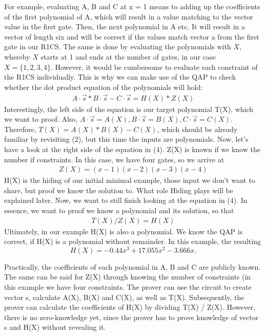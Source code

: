 For example, evaluating A, B and C at x = 1 means to adding up the coefficients of the first polynomial of A, which will result in a value matching to the vector value in the first gate. Then, the next polynomial in A etc. It will result in a vector of length six and will be correct if the values match vector a from the first gate in our R1CS. The same is done by evaluating the polynomials with \(X\), whereby \(X\) starts at 1 and ends at the number of gates, in our case \(X=\{1,2,3,4\}\).
However, it would be cumbersome to evaluate each constraint of the R1CS individually. This is why we can make use of the QAP to check whether the dot product equation of the polynomials will hold:
\begin{align}
    A\cdot \Vec{s} * B\cdot \Vec{s} - C\cdot \Vec{s} = H(X) * Z(X)
\end{align}
Interestingly, the left side of the equation is our target polynomial T(X), which we want to proof. Also, \(A \cdot \Vec{s} = A(X), B \cdot \Vec{s} = B(X),  C \cdot \Vec{s} = C(X).\) 
Therefore, \(T(X) = A(X) * B(X) - C(X)\), which should be already familiar by revisiting (2), but this time the inputs are polynomials.
Now, let's have a look at the right side of the equation in (4). Z(X) is known if we know the number if constraints. In this case, we have four gates, so we arrive at
\begin{align}
    Z(X) = (x-1)(x-2)(x-3)(x-4)
\end{align}
H(X) is the hiding of our initial minimal example, those input we don't want to share, but proof we know the solution to. What role Hiding plays will be explained later. Now, we want to still finish looking at the equation in (4). In essence, we want to proof we know a polynomial and its solution, so that
\begin{align}
    T(X) / Z(X) = H(X)
\end{align}
Ultimately, in our example H(X) is also a polynomial. We know the QAP is correct, if H(X) is a polynomial without remainder. In this example, the resulting
\[H(X) = -0.44x^3 + 17.055x^2 - 3.666x.\]

Practically, the coefficients of each polynomial in A, B and C are publicly known. The same can be said for Z(X) through knowing the number of constraints (in this example we have four constraints. The prover can use the circuit to create vector s, calculate A(X), B(X) and C(X), as well as T(X). Subsequently, the prover can calculate the coefficients of H(X) by dividing T(X) / Z(X). However, there is no zero-knowledge yet, since the prover has to prove knowledge of vector s and H(X) without revealing it.
\newpage


